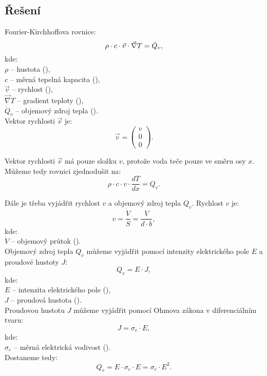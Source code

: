 \documentclass{article}
\begin{document}
\subsection{Řešení}
Fourier-Kirchhoffova rovnice:
\begin{equation}
    \rho \cdot c \cdot \vec{v} \cdot \vec{\nabla} T = \dot{Q}_v,
    \unit{(\ueqWandMinvcu)}
\end{equation}
kde:\\
$\rho$ -- hustota (\ueqKGandMinvcu),\\
$c$ -- měrná tepelná kapacita (\ueqJandKGinvKinv),\\
$\vec{v}$ -- rychlost (\ueqMandSinv),\\
$\vec{\nabla} T$ -- gradient teploty (\ueqKandMinv),\\
$\dot{Q}_v$ -- objemový zdroj tepla (\ueqWandMinvcu).\\

Vektor rychlosti $\vec{v}$ je:
$$
    \vec{v} = \begin{pmatrix} v \\ 0 \\ 0 \end{pmatrix}.
$$

Vektor rychlosti $\vec{v}$ má pouze složku $v$, protože voda teče pouze ve směru osy $x$. Můžeme tedy rovnici zjednodušit na:
$$
    \rho \cdot c \cdot v \cdot \frac{dT}{dx} = Q_v.
$$

Dále je třeba vyjádřit rychlost $v$ a objemový zdroj tepla $Q_v$. Rychlost $v$ je:
$$
    v = \frac{\dot{V}}{S} = \frac{\dot{V}}{d \cdot b},
$$
kde:\\
$\dot{V}$ -- objemový průtok (\ueqMcuSinv).\\

Objemový zdroj tepla $Q_v$ můžeme vyjádřit pomocí intenzity elektrického pole $E$ a proudové hustoty $J$:
$$
    Q_v = E \cdot J,
$$
kde:\\
$E$ -- intenzita elektrického pole (\ueqVandMinv),\\
$J$ -- proudová hustota (\ueqAandMinvsq).\\

Proudovou hustotu $J$ můžeme vyjádřit pomocí Ohmova zákona v diferenciálním tvaru:
$$
    J = \sigma_e \cdot E,
$$
kde:\\
$\sigma_e$ -- měrná elektrická vodivost (\ueqOHMandMinv).\\

Dostaneme tedy:
$$
    Q_v = E \cdot \sigma_e \cdot E = \sigma_e \cdot E^2.
$$
\end{document}
